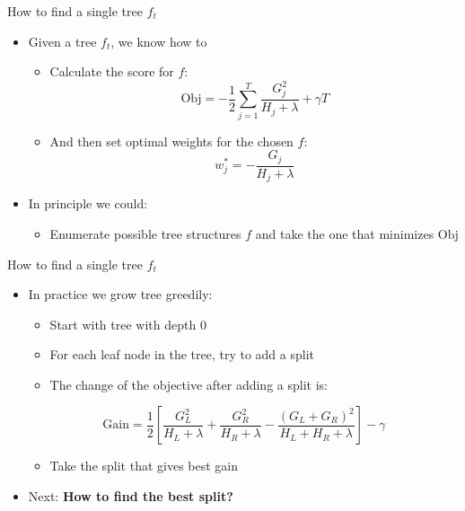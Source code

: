 \begin{frame}{How to find a single tree \( f_t \)}
\begin{itemize}
\item Given a tree \( f_t \), we know how to
\begin{itemize}
    \item Calculate the score for \( f \):
    \[
        \text{Obj} = -\frac{1}{2} \sum_{j=1}^{T} \frac{G_j^2}{H_j + \lambda} + \gamma T
    \]

    \item And then set optimal weights for the chosen \( f \):
    \[
        w_j^* = -\frac{G_j}{H_j + \lambda}
    \]
\end{itemize}


\item In principle we could:
\begin{itemize}
    \item Enumerate possible tree structures \( f \) and take the one that minimizes \( \text{Obj} \)
\end{itemize}
\end{itemize}
\end{frame}

\begin{frame}{How to find a single tree \( f_t \)}
\begin{itemize}
\item In practice we grow tree greedily:
\begin{itemize}
    \item Start with tree with depth 0
    \item For each leaf node in the tree, try to add a split
    \item The change of the objective after adding a split is:
\end{itemize}

\[
\text{Gain} = \frac{1}{2} \left[ \frac{G_L^2}{H_L + \lambda} + \frac{G_R^2}{H_R + \lambda} - \frac{(G_L + G_R)^2}{H_L + H_R + \lambda} \right] - \gamma
\]

\begin{itemize}
    \item Take the split that gives best gain
\end{itemize}

\item Next: \textbf{How to find the best split?}
\end{itemize}
\end{frame}


